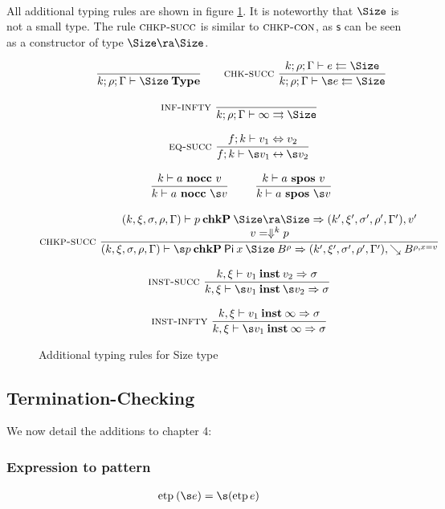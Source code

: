 \paragraph*{}
\noindent All additional typing rules are shown in figure \ref{fadd}.
It is noteworthy that $\Size$ is not a small type.
The rule $\mbox{\sc chkp-succ}$ is similar to $\mbox{\sc chkp-con}$, as $\mathsf{s}$ can be seen as a constructor of type $\Size \ra \Size$.
\begin{figure}[htp]
\begin{gather*}
\nru{}{}{\IsType{k}{\rho}{\Gamma}{\Size}}
\qquad
\nru{\chksucc}
{\Check{k}{\rho}{\Gamma}{e}{\Size}}
{\Check{k}{\rho}{\Gamma}{\s e}{\Size}} 
\\[2ex]
\nru{\infinfty}{}{\Infer{k}{\rho}{\Gamma}{\infty}{\Size}} 
\\[2ex]
\nru{\eqsuc}
{\EqVal{f}{k}{v_1}{v_2}}
{\FeqVal{f}{k}{\s v_1}{\s v_2}}
\\[2ex]
\nru{}
{\nocc{k}{a}{v}}
{\nocc{k}{a}{\s v}}
\qquad
\nru{}
{\spos{k}{a}{v}}
{\spos{k}{a}{\s v}}
\\[2ex]
\ndru{\chkpsucc}
{
\checkp{k,\xi,\sigma,\rho,\Gamma}{p}{\Size \ra \Size}
{k',\xi',\sigma',\rho',\Gamma'}{v'}}
{v = \ptv{k}{p} }
{
\checkp
{k,\xi,\sigma,\rho,\Gamma}
{\s p}
{\vpi \: x \: \Size \: \cl{B}{\rho}}
{k',\xi',\sigma',\rho',\Gamma'}{\wh \cl{B}{\ins{\rho}{x}{v}}}}
\\[2ex]
\nru{\unifys}
{\unify{k}{\xi}{v_1}{v_2}{\sigma}}
{\unify{k}{\xi}{\s v_1}{\s v_2}{\sigma}
}
\\[2ex]
\nru{\unifyi}
{\unify{k}{\xi}{v_1}{\infty}{\sigma}}
{\unify{k}{\xi}{\s v_1}{\infty}{\sigma}
}
\end{gather*}
\caption{Additional typing rules for Size type}
\label{fadd}
\end{figure}

\subsection{Termination-Checking}

We now detail the additions to chapter 4:

\subsubsection{Expression to pattern}
\[
\begin{array}[t]{ll}
\etp \: (\s e) = \s (\etp e) \\
\end{array}
\]

